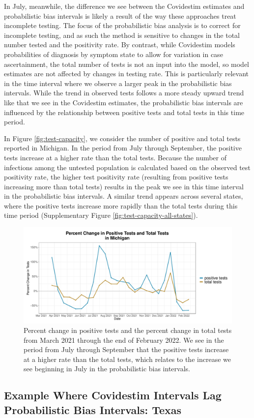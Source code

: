 \documentclass[12pt,twoside]{smiththesis}
\begin{document}
In July, meanwhile, the difference we see between the Covidestim estimates and probabilistic bias intervals is likely a result of the way these approaches treat incomplete testing. The focus of the probabilistic bias analysis is to correct for incomplete testing, and as such the method is sensitive to changes in the total number tested and the positivity rate. By contrast, while Covidestim models probabilities of diagnosis by symptom state to allow for variation in case ascertainment, the total number of tests is not an input into the model, so model estimates are not affected by changes in testing rate. This is particularly relevant in the time interval where we observe a larger peak in the probabilistic bias intervals. While the trend in observed tests follows a more steady upward trend like that we see in the Covidestim estimates, the probabilistic bias intervals are influenced by the relationship between positive tests and total tests in this time period.

In Figure \ref{fig:test-capacity}, we consider the number of positive and total tests reported in Michigan. In the period from July through September, the positive tests increase at a higher rate than the total tests. Because the number of infections among the untested population is calculated based on the observed test positivity rate, the higher test positivity rate (resulting from positive tests increasing more than total tests) results in the peak we see in this time interval in the probabilistic bias intervals. A similar trend appears across several states, where the positive tests increase more rapidly than the total tests during this time period (Supplementary Figure \ref{fig:test-capacity-all-states}).
\begin{figure}
\includegraphics[width=1\linewidth]{figure/test_capacity} \caption{\label{fig:test-capacity} Percent change in positive tests and the percent change in total tests from March 2021 through the end of February 2022. We see in the period from July through September that the positive tests increase at a higher rate than the total tests, which relates to the increase we see beginning in July in the probabilistic bias intervals.}\label{fig:unnamed-chunk-66}
\end{figure}
\hypertarget{example-where-covidestim-intervals-lag-probabilistic-bias-intervals-texas}{%
\subsection{Example Where Covidestim Intervals Lag Probabilistic Bias Intervals: Texas}\label{example-where-covidestim-intervals-lag-probabilistic-bias-intervals-texas}}
\end{document}
